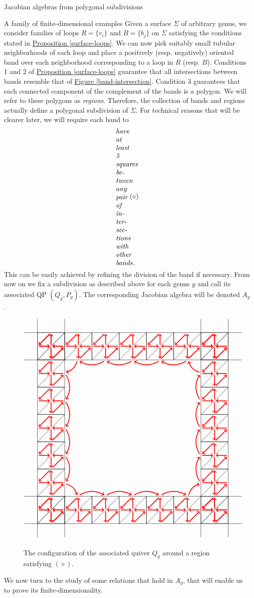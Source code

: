 \begin{chapter}{Jacobian algebras from polygonal subdivisions}
\begin{section}{A family of finite-dimensional examples}
Given a surface $\Sigma$ of arbitrary genus, we consider families of loops $R=\{r_i\}$ and $B=\{b_j\}$ on $\Sigma$ satisfying the conditions stated in \hyperref[surface-loops]{Proposition \ref*{surface-loops}}. We can now pick suitably small tubular neighborhoods of each loop and place a positively (resp. negatively) oriented band over each neighborhood corresponding to a loop in $R$ (resp. $B$). Conditions 1 and 2 of \hyperref[surface-loops]{Proposition \ref*{surface-loops}} guarantee that all intersections between bands resemble that of \hyperref[band-intersection]{Figure \ref*{band-intersection}}. Condition 3 guarantees that each connected component of the complement of the bands is a polygon. We will refer to these polygons as \emph{regions}. Therefore, the collection of bands and regions actually define a polygonal subdivision of $\Sigma$. For technical reasons that will be clearer later, we will require each band to
\[
\label{diamondhyp}
\claim{have at least 5 squares between any pair of intersections with other bands.}\tag{$\diamond$}
\]
This can be easily achieved by refining the division of the band if necessary. From now on we fix a subdivision as described above for each genus $g$ and call its associated QP $(Q_g,P_g)$. The corresponding Jacobian algebra will be denoted $A_g$.

\begin{figure}[h]
\[
\begin{tikzpicture}[scale=0.7]
\foreach \x in {-6,-4,...,6}
{
\ArrowedSquare{\x}{6}
\ArrowedSquare{\x}{-6}
\ArrowedSquare{6}{\x}
\ArrowedSquare{-6}{\x}
}
\draw (-8,-7) to (-7,-7);
\draw (-8,-5) to (-7,-5);
\draw (8,-7) to (7,-7);
\draw (8,-5) to (7,-5);
\draw (-8,7) to (-7,7);
\draw (-8,5) to (-7,5);
\draw (8,7) to (7,7);
\draw (8,5) to (7,5);
\draw (-7,-8) to (-7,-7);
\draw (-5,-8) to (-5,-7);
\draw (-7,8) to (-7,7);
\draw (-5,8) to (-5,7);
\draw (7,-8) to (7,-7);
\draw (5,-8) to (5,-7);
\draw (7,8) to (7,7);
\draw (5,8) to (5,7);
\foreach \x in {-4,-2,...,2}
{
\draw[<-, red, very thick] (-6+1.1, \x + 0.1) to [bend right] (-6+1.1, \x + 1.9);
\draw[->, red, very thick] (6-1.1, \x + 0.1) to [bend left] (6-1.1, \x + 1.9);
\draw[->, red, very thick] (\x + 0.1,-6+1.1) to [bend left] (\x + 1.9,-6+1.1);
\draw[<-, red, very thick] (\x + 0.1, 6-1.1) to [bend right] (\x + 1.9, 6-1.1);
}
\draw[->, red, very thick] (-4-0.1, 6-1.1) to [bend left] (-6+1.1, 4+0.1);
\draw[<-, red, very thick] (4+0.1, 6-1.1) to [bend right] (6-1.1, 4+0.1);
\draw[<-, red, very thick] (6-1.1, -4-0.1) to [bend right] (4+0.1, -6+1.1);
\draw[->, red, very thick] (-6+1.1, -4-0.1) to [bend left] (-4-0.1,-6+1.1);
\end{tikzpicture}
\]
\caption{The configuration of the associated quiver $Q_g$ around a region satisfying \hyperref[diamondhyp]{$(\diamond)$}.}
\end{figure}
We now turn to the study of some relations that hold in $A_g$, that will enable us to prove its finite-dimensionality.


\end{section}
\end{chapter}

